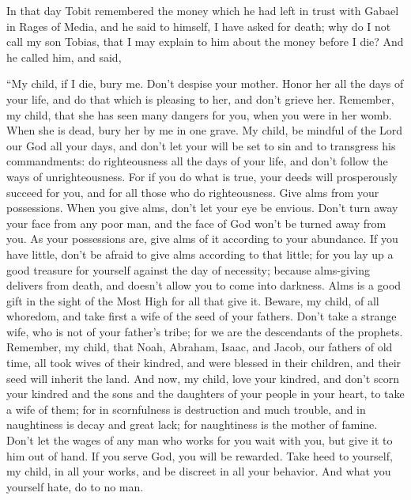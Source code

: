  In that day Tobit remembered the money which he had left
in trust with Gabael in Rages of Media,  and he said to
himself, I have asked for death; why do I not call my son Tobias, that I
may explain to him about the money before I die?  And he
called him, and said,

``My child, if I die, bury me. Don't despise your mother. Honor her all
the days of your life, and do that which is pleasing to her, and don't
grieve her.  Remember, my child, that she has seen many
dangers for you, when you were in her womb. When she is dead, bury her
by me in one grave.  My child, be mindful of the Lord our
God all your days, and don't let your will be set to sin and to
transgress his commandments: do righteousness all the days of your life,
and don't follow the ways of unrighteousness.  For if you
do what is true, your deeds will prosperously succeed for you, and for
all those who do righteousness.  Give alms from your
possessions. When you give alms, don't let your eye be envious. Don't
turn away your face from any poor man, and the face of God won't be
turned away from you.  As your possessions are, give alms
of it according to your abundance. If you have little, don't be afraid
to give alms according to that little;  for you lay up a
good treasure for yourself against the day of necessity; 
because alms-giving delivers from death, and doesn't allow you to come
into darkness.  Alms is a good gift in the sight of the
Most High for all that give it.  Beware, my child, of all
whoredom, and take first a wife of the seed of your fathers. Don't take
a strange wife, who is not of your father's tribe; for we are the
descendants of the prophets. Remember, my child, that Noah, Abraham,
Isaac, and Jacob, our fathers of old time, all took wives of their
kindred, and were blessed in their children, and their seed will inherit
the land.  And now, my child, love your kindred, and
don't scorn your kindred and the sons and the daughters of your people
in your heart, to take a wife of them; for in scornfulness is
destruction and much trouble, and in naughtiness is decay and great
lack; for naughtiness is the mother of famine.  Don't let
the wages of any man who works for you wait with you, but give it to him
out of hand. If you serve God, you will be rewarded. Take heed to
yourself, my child, in all your works, and be discreet in all your
behavior.  And what you yourself hate, do to no man.
